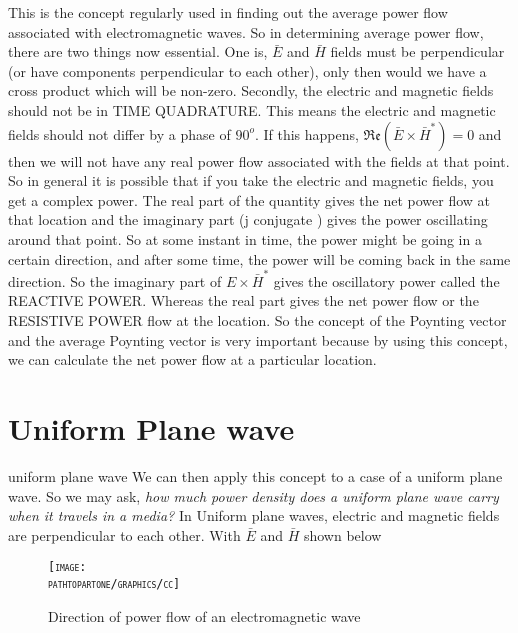 This is the concept regularly used in finding out the average power flow associated with electromagnetic waves. So in determining average power flow, there are two things now essential. One is, $ \bar{E} $ and $ \bar{H} $ fields must be perpendicular (or have components perpendicular to each other), only then would we have a cross product which will be non-zero. Secondly, the electric and magnetic fields should not be in TIME QUADRATURE. This means the electric and magnetic fields should not differ by a phase of $90^{o}$. If this happens, $ \mathfrak{Re}(\bar{E}\times\bar{H}^{*})=0 $ and then we will not have any real power flow associated with the fields at that point. So in general it is possible that if you take the electric and magnetic fields, you get a complex power. The real part of the quantity gives the net power flow at that location and the imaginary part (j conjugate ) gives the power oscillating around that point. So at some instant in time, the power might be going in a certain direction, and after some time, the power will be coming back in the same direction. So the imaginary part of $ E\times\bar{H}^{*} $ gives the oscillatory power called the REACTIVE POWER. Whereas the real part gives the net power flow or the RESISTIVE POWER flow at the location. So the concept of the Poynting vector and the average Poynting vector is very important because by using this concept, we can calculate the net power flow at a particular location.

\section{Uniform Plane wave}uniform plane wave
We can then apply this concept to a case of a uniform plane wave. So we may ask, \emph{how much power density does a uniform plane wave carry when it travels in a media?} In Uniform plane waves, electric and magnetic fields are perpendicular to each other. With $ \bar{E} $ and $ \bar{H} $ shown below
\begin{figure}[h]
\centering
\textsc{\texttt{[image: \\pathtopartone/graphics/cc]}}
\caption{Direction of power flow of an electromagnetic wave}
\end{figure}

